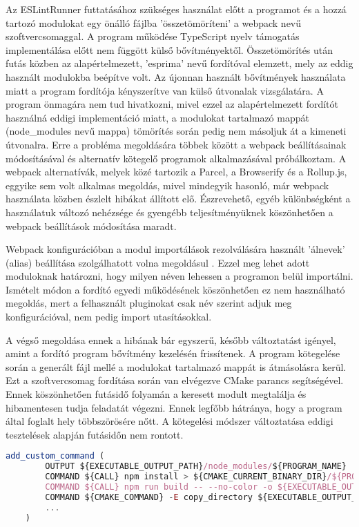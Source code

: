 Az ESLintRunner futtatásához szükséges használat előtt a programot és a hozzá tartozó modulokat egy önálló fájlba 'összetömöríteni' a webpack nevű szoftvercsomaggal. A program működése TypeScript nyelv támogatás implementálása előtt nem függött külső bővítményektől. Összetömörítés után futás közben az alapértelmezett, 'esprima' nevű fordítóval elemzett, mely az eddig használt modulokba beépítve volt. Az újonnan használt bővítmények használata miatt a program fordítója kényszerítve van külső útvonalak vizsgálatára. A program önmagára nem tud hivatkozni, mivel ezzel az alapértelmezett fordítót használná eddigi implementáció miatt, a modulokat tartalmazó mappát (node\_modules nevű mappa) tömörítés során pedig nem másoljuk át a kimeneti útvonalra. Erre a probléma megoldására többek között a webpack beállításainak módosításával és alternatív kötegelő programok alkalmazásával próbálkoztam. A webpack alternatívák, melyek közé tartozik a Parcel, a Browserify és a Rollup.js, eggyike sem volt alkalmas megoldás, mivel mindegyik hasonló, már webpack használata közben észlelt hibákat állított elő. Észrevehető, egyéb különbségként a használatuk változó nehézsége és gyengébb teljesítményüknek köszönhetően a webpack beállítások módosítása maradt.

Webpack konfigurációban a modul importálások rezolválására használt 'álnevek' (alias) beállítása szolgálhatott volna megoldásul \cite{webpack-resolve}. Ezzel meg lehet adott moduloknak határozni, hogy milyen néven lehessen a programon belül importálni. Ismételt módon a fordító egyedi működésének köszönhetően ez nem használható megoldás, mert a felhasznált pluginokat csak név szerint adjuk meg konfigurációval, nem pedig import utasításokkal.

A végső megoldása ennek a hibának bár egyszerű, később változtatást igényel, amint a fordító program bővítmény kezelésén frissítenek. A program kötegelése során a generált fájl mellé a modulokat tartalmazó mappát is átmásolásra kerül. Ezt a szoftvercsomag fordítása során van elvégezve CMake parancs segítségével. Ennek köszönhetően futásidő folyamán a keresett modult megtalálja és hibamentesen tudja feladatát végezni. Ennek legfőbb hátránya, hogy a program által foglalt hely többszörösére nőtt. A kötegelési módszer változtatása eddigi tesztelések alapján futásidőn nem rontott.

\begin{lstlisting}[caption={CMake parancs modul mappa másolására},label={lst:cmakeeslint}, language={JavaScript}]
    add_custom_command (
        OUTPUT ${EXECUTABLE_OUTPUT_PATH}/node_modules/${PROGRAM_NAME}
        COMMAND ${CALL} npm install > ${CMAKE_CURRENT_BINARY_DIR}/${PROGRAM_NAME}-npm-install.log 2>&1
        COMMAND ${CALL} npm run build -- --no-color -o ${EXECUTABLE_OUTPUT_PATH}/node_modules/${PROGRAM_NAME} > ${CMAKE_CURRENT_BINARY_DIR}/${PROGRAM_NAME}-npm-build.log 2>&1
        COMMAND ${CMAKE_COMMAND} -E copy_directory ${EXECUTABLE_OUTPUT_PATH}/tmp_${PROGRAM_NAME}/node_modules/ ${EXECUTABLE_OUTPUT_PATH}/node_modules/${PROGRAM_NAME}/node_modules/
        ...
    )
\end{lstlisting}

